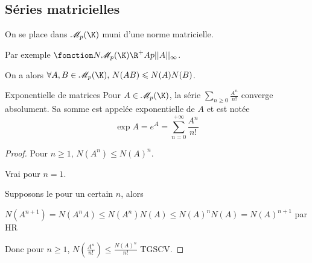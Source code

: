 \subsection{Séries matricielles }

On se place dans $\mathscr M_p(\K)$ muni d'une norme matricielle. 

Par exemple $\fonction N {\mathscr M_p(\K)} {\R^+} A {p ||A||_\infty}$. 

On a alors $\forall A, B \in \mathscr M_p(\K), \, N(AB) \leqslant N(A) N(B)$.

\begin{theoreme}{Exponentielle de matrices}{}
    Pour $A \in \mathscr M_p(\K)$, la série $\sum_{n \geqslant 0} \frac{A^n}{n!}$ converge absolument. 
    Sa somme est appelée exponentielle de $A$ et est notée 
    $$\displaystyle \operatorname{exp} A = e^A = \sum_{n = 0}^{+\infty} \frac{A^n}{n!}$$
\end{theoreme}


\begin{proof}
    Pour $n \geqslant 1$, $N(A^n) \leqslant N(A)^n$.

    Vrai pour $n = 1$. 

    Supposons le pour un certain $n$, alors 

    $N(A^{n + 1}) = N(A^n A) \leqslant N(A^n) N(A) \leqslant N(A)^n N(A) = N(A)^{n + 1}$
    par HR 

    Donc pour $n \geqslant 1$, $N\left( \frac{A^n}{n!} \right) \leqslant \frac{N(A)^n}{n!}$ TGSCV. 
\end{proof}

